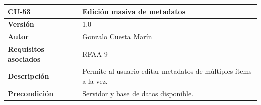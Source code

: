 \documentclass[
]{article}
\begin{document}
\begin{longtable}[]{@{}ll@{}}
\toprule
\begin{minipage}[b]{0.15\columnwidth}\raggedright
\textbf{CU-53}\strut
\end{minipage} & \begin{minipage}[b]{0.79\columnwidth}\raggedright
\textbf{Edición masiva de metadatos}\strut
\end{minipage}\tabularnewline
\midrule
\endhead
\begin{minipage}[t]{0.15\columnwidth}\raggedright
\textbf{Versión}\strut
\end{minipage} & \begin{minipage}[t]{0.79\columnwidth}\raggedright
1.0\strut
\end{minipage}\tabularnewline
\begin{minipage}[t]{0.15\columnwidth}\raggedright
\textbf{Autor}\strut
\end{minipage} & \begin{minipage}[t]{0.79\columnwidth}\raggedright
Gonzalo Cuesta Marín\strut
\end{minipage}\tabularnewline
\begin{minipage}[t]{0.15\columnwidth}\raggedright
\textbf{Requisitos asociados}\strut
\end{minipage} & \begin{minipage}[t]{0.79\columnwidth}\raggedright
RFAA-9\strut
\end{minipage}\tabularnewline
\begin{minipage}[t]{0.15\columnwidth}\raggedright
\textbf{Descripción}\strut
\end{minipage} & \begin{minipage}[t]{0.79\columnwidth}\raggedright
Permite al usuario editar metadatos de múltiples ítems a la vez.\strut
\end{minipage}\tabularnewline
\begin{minipage}[t]{0.15\columnwidth}\raggedright
\textbf{Precondición}\strut
\end{minipage} & \begin{minipage}[t]{0.79\columnwidth}\raggedright
Servidor y base de datos disponible.


\end{minipage}
\end{longtable}
\end{document}
